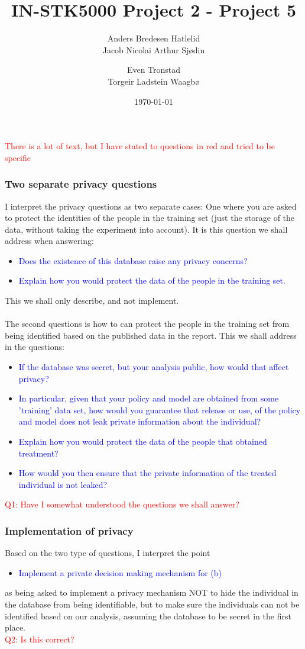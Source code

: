 \documentclass[a4paper, 12pt]{extarticle}
\title{IN-STK5000 Project 2 - Project 5}
\author{Anders Bredesen Hatlelid \\
        Jacob Nicolai Arthur Sjødin \\
        \and
        Even Tronstad \\
        Torgeir Ladstein Waagbø 
}
\date{\today}
\begin{document}
\maketitle

\noindent \textcolor{red}{There is a lot of text, but I have stated to questions in red and tried to be specific}
\subsubsection*{Two separate privacy questions}
I interpret the privacy questions as two separate cases: One where you are asked to protect the identities of the people in the training set (just the storage of the data, without taking the experiment into account). It is this question we shall address when answering:
\begin{itemize}
    \item \textcolor{blue}{Does the existence of this database raise any privacy concerns?}
    \item \textcolor{blue}{Explain how you would protect the data of the people in the training set.}
\end{itemize}
This we shall only describe, and not implement. 
\\
\\
The second questions is how to can protect the people in the training set from being identified based on the published data in the report. This we shall address in the questions: 
\begin{itemize}
    \item \textcolor{blue}{If the database was secret, but your analysis public, how would that affect privacy?}
    \item \textcolor{blue}{In particular, given that your policy and model are obtained from some 'training' data set, how would you guarantee that release or use, of the policy and model does not leak private information about the individual?}
    \item \textcolor{blue}{Explain how you would protect the data of the people that obtained treatment?}
    \item \textcolor{blue}{How would you then ensure that the private information of the treated individual is not leaked?}
\end{itemize}
\noindent \textcolor{red}{Q1: Have I somewhat understood the questions we shall answer?}

\subsubsection*{Implementation of privacy}
Based on the two type of questions, I interpret the point 
\begin{itemize}
    \item \textcolor{blue}{Implement a private decision making mechanism for (b)}
\end{itemize}
as being asked to implement a privacy mechanism NOT to hide the individual in the database from being identifiable, but to make sure the individuals can not be identified based on our analysis, assuming the database to be secret in the first place.
\\
\noindent \textcolor{red}{Q2: Is this correct?}
\end{document}
